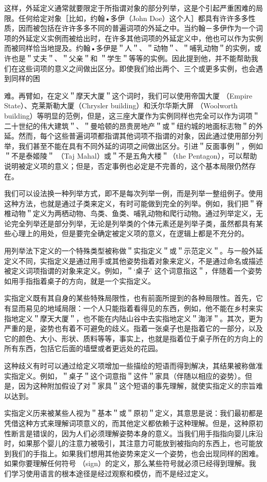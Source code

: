这样，外延定义通常就要限定于所指谓对象的部分列举，这是个引起严重困难的局限。任何给定对象［比如，约翰•多伊（John Doe）这个人］都具有许许多多性质，因而被包括在许许多多不同的普遍词项的外延之中。当约翰－多伊作为一个词项的外延定义实例而被给出时，在许多其他词项的外延定义中，他也可以作为实例而被同样恰当地提及。约翰•多伊是＂人＂、＂动物＂、＂哺乳动物＂的实例，或许也是＂丈夫＂、＂父亲＂和 ＂学生＂等等的实例。因此提到他，并不能帮助我们在这些词项的意义之间做出区分。即使我们给出两个、三个或更多实例，也会遇到同样的困

难。再臂如，在定义＂摩天大厦＂这个词时，我们可以使用帝国大厦 （Empire State）、克莱斯勒大厦（Chrysler building）和沃尔华斯大屏 （Woolworth building）等明显的范例，但是，这三座大厦作为实例同样也完全可以作为词项＂二十世纪的伟大建筑＂、＂曼哈顿的昂贵房地产＂或＂纽约城的地面标志物＂的外延。然而，每个这些普遍词项都指谓其他词项不指谓的对象，因此通过使用部分列举，我们甚至不能在具有不同外延的词项之间做出区分。引进＂反面事例＂，例如＂不是泰姬陵＂ （Taj Mahal）或＂不是五角大楼＂（the Pentagon），可以帮助说明被定义项的意义；但是，否定事例也必定是不完善的，这个基本局限仍然存在。

我们可以设法换一种列举方式，即不是每次列举一例，而是列举一整组例子。使用这种方法，也就是通过子类来定义，有时可能做到完全的列举。例如，我们把＂脊椎动物＂定义为两栖动物、鸟类、鱼类、哺乳动物和爬行动物。通过列举定义，无论完全列举还是部分列举，无论是列举类的个体元素还是列举子类，虽然都具有某些心理上的用处，但是要完全确定被定义项的意义，在逻辑上都是不充分的。

用列举法下定义的一个特殊类型被称做＂实指定义＂或＂示范定义＂。与一般外延定义不同，实指定义是通过用手或其他姿势指着对象来定义，不是通过命名或描述被定义词项指谓的对象来定义。例如，＂‘桌子’ 这个词意指这＂，伴随着一个姿势如用手指指着桌子的方向，就是一个实指定义。

实指定义既有其自身的某些特殊局限性，也有前面所提到的各种局限性。首先，它有显而易见的地域局限：一个人只能指着看得见的东西，例如，他不能在乡村来实指地定义＂摩天大厦＂，也不能在内陆山谷中去实指地定义＂海洋＂。其次，更为严重的是，姿势也有着不可避免的歧义。指着一张桌子也是指着它的一部分，以及它的颜色、大小、形状、质料等等，事实上，也就是指着位于桌子所在的方向上的所有东西，包括它后面的墙壁或者更远处的花园。

这种歧义有时可以通过给定义项增加一些描绘的短语而得到解决，其结果被称做准实指定义。例如，＂桌子＂这个词意指＂这件＂家具（伴随以相应的姿势）。但是，因为这种附加假设了对＂家具＂这个短语的事先理解，就使实指定义的宗旨难以达到。

实指定义历来被某些人视为＂基本＂或＂原初＂定义，其意思是说：我们最初都是凭借这种方式来理解词项意义的，而其他定义都依赖于这种理解。但是，这种原初性断言是错误的，因为人们必须理解姿勢本身的意义。当我们用手指指向婴儿床沿时，如果那个婴儿的注意力被吸引，其注意力可能放到被指向的东西上，也可能放到我们的手指上。如果我们想用其他姿势来定义一个姿势，也会出现同样的困难。如果你要理解任何符号 （sign）的定义，那么某些符号就必须已经得到理解。我们学习使用语言的根本途径是经过观察和模仿，而不是经过定义。

